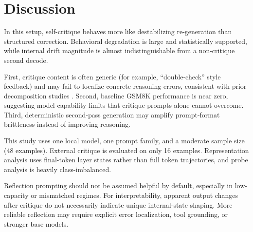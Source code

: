 \section{Discussion}
\label{sec:discussion}
 In this setup, self-critique behaves more like destabilizing re-generation than structured correction. Behavioral degradation is large and statistically supported, while internal drift magnitude is almost indistinguishable from a non-critique second decode.

 First, critique content is often generic (for example, ``double-check'' style feedback) and may fail to localize concrete reasoning errors, consistent with prior decomposition studies \citep{chen2024errorlocation}. Second, baseline GSM8K performance is near zero, suggesting model capability limits that critique prompts alone cannot overcome. Third, deterministic second-pass generation may amplify prompt-format brittleness instead of improving reasoning.

 This study uses one local model, one prompt family, and a moderate sample size (48 examples). External critique is evaluated on only 16 examples. Representation analysis uses final-token layer states rather than full token trajectories, and probe analysis is heavily class-imbalanced.

 Reflection prompting should not be assumed helpful by default, especially in low-capacity or mismatched regimes. For interpretability, apparent output changes after critique do not necessarily indicate unique internal-state shaping. More reliable reflection may require explicit error localization, tool grounding, or stronger base models.
